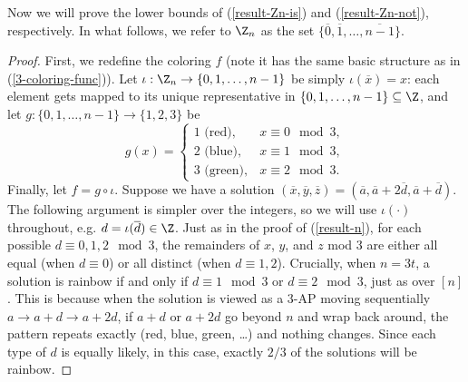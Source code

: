 Now we will prove the lower bounds of (\ref{result-Zn-is}) and (\ref{result-Zn-not}), respectively.
In what follows, we refer to $\Z_n$ as the set $\{\overline{0}, \overline{1}, \dots, \overline{n-1}\}$.

\begin{proof} 

        First, we redefine the coloring $f$ (note it has the same basic structure as in (\ref{3-coloring-func})).
        Let $\iota : \Z_n \to \{0,1,\dots,n-1\}$ be simply $\iota(\overline{x}) = x$: each element gets mapped to its unique representative in $\{0,1,\dots,n-1\} \subseteq \Z$, and let $g : \{0,1,\dots,n-1\} \to \{1, 2, 3\}$ be
        \begin{equation}
        g(x) = 
\begin{cases}
1 \text{ (red)}, & x \equiv 0 \mod 3, \\
2 \text{ (blue)}, & x \equiv 1 \mod 3, \\
3 \text{ (green)}, & x \equiv 2 \mod 3.
\end{cases}
        \end{equation}
        Finally, let $f = g \circ \iota$. Suppose we have a solution $(\overline{x}, \overline{y}, \overline{z}) = (\overline{a}, \overline{a} + 2\overline{d}, \overline{a} + \overline{d})$. The following argument is simpler over the integers, so we will use $\iota(\cdot)$ throughout, e.g. $d = \iota(\overline{d}) \in \Z$. Just as in the proof of (\ref{result-n}), for each possible $d \equiv 0, 1, 2 \mod 3$, 
the remainders of $x$, $y$, and $z$ mod $3$ are either all equal (when $d \equiv 0$) or all distinct (when $d \equiv 1, 2$).
Crucially, when $n = 3t$, a solution is rainbow if and only if $d \equiv 1 \mod{3}$ or $d \equiv 2 \mod{3}$, just as over $[n]$.
This is because when the solution is viewed as a $3$-AP moving sequentially $a \to a + d \to a + 2d$, if $a + d$ or $a + 2d$ go beyond $n$
and wrap back around,
the pattern repeats exactly (red, blue, green, \dots) and nothing changes.
Since each type of $d$ is equally likely, in this case, exactly $2/3$ of the solutions will be rainbow.


\end{proof}
